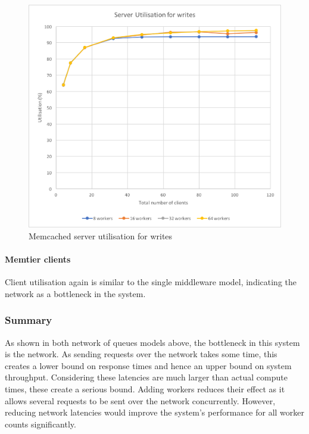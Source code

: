 \documentclass[11pt,a4paper]{article}
\begin{document}
\begin{figure}[!h]
\begin{minipage}[b]{.45\textwidth}
        \includegraphics[width=\textwidth]{processing/graphics/q_network_svr_util_2mw_writes.png}
        \caption{Memcached server utilisation for writes}
        \label{png::q_network_svr_util_2mw_writes}
    \end{minipage}
\end{figure}

\paragraph{Memtier clients}
Client utilisation again is similar to the single middleware model, indicating the network as a bottleneck in the system.

\subsubsection{Summary}
As shown in both network of queues models above, the bottleneck in this system is the network. As sending requests over the network takes some time, this creates a lower bound on response times and hence an upper bound on system throughput. Considering these latencies are much larger than actual compute times, these create a serious bound. Adding workers reduces their effect as it allows several requests to be sent over the network concurrently. However, reducing network latencies would improve the system's performance for all worker counts significantly.
\end{document}
